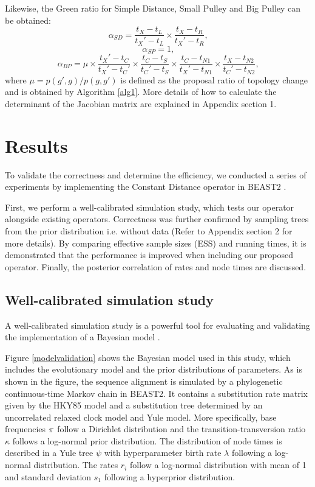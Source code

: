 \documentclass{bmcart}
\begin{document}
Likewise, the Green ratio for Simple Distance, Small Pulley and  Big Pulley can be obtained:
\begin{equation}\label{HR2}
{\alpha_{SD}} = \frac{{{t_X} - {t_L}}}{{{t_X}' - {t_L}}} \times \frac{{{t_X} - {t_R}}}{{{t_X}' - {t_R}}}\text{,}
\end{equation}
\begin{equation}\label{HR3}
{\alpha_{SP}}  = 1\text{,}
\end{equation}
\begin{equation}\label{HR4}
{\alpha_{BP}} = \mu \times \frac{{{t_X}' - {t_C}}}{{{t_X}' - {t_C}'}} \times \frac{{{t_C} - {t_S}}}{{{t_C}' - {t_S}}} \times \frac{{{t_C} - {t_{N1}}}}{{{t_X}' - {t_{N1}}}} \times \frac{{{t_X} - {t_{N2}}}}{{{t_C}' - {t_{N2}}}}\text{,}
\end{equation}
where $\mu = p(g', g) / p(g, g')$ is defined as the proposal ratio of topology change and is obtained by Algorithm \ref{alg1}. More details of how to calculate the determinant of the Jacobian matrix are explained in Appendix section 1.

\section*{Results}
To validate the correctness and determine the efficiency, we conducted a series of experiments by implementing the Constant Distance operator in BEAST2 \cite{bouckaert2014beast}.

First, we perform a well-calibrated simulation study, which tests our operator alongside existing operators. Correctness was further confirmed by sampling trees from the prior distribution i.e. without data (Refer to Appendix section 2 for more details). By comparing effective sample sizes (ESS) \cite{Tracer} and running times, it is demonstrated that the performance is improved when including our proposed operator. Finally, the posterior correlation of rates and node times are discussed.

\subsection*{Well-calibrated simulation study}
A well-calibrated simulation study is a powerful tool for evaluating and validating the implementation of a Bayesian model \cite{dawid1982well}.

Figure \ref{modelvalidation} shows the Bayesian model used in this study, which includes the evolutionary model and the prior distributions of parameters. As is shown in the figure, the sequence alignment is simulated by a phylogenetic continuous-time Markov chain in BEAST2. It contains a substitution rate matrix given by the HKY85 \cite{hasegawa1985dating} model and a substitution tree determined by an uncorrelated relaxed clock model and Yule model. More specifically, base frequencies $\bf{\pi}$ follow a Dirichlet distribution and the transition-transversion ratio $\kappa$ follows a log-normal prior distribution. The distribution of node times is described in a Yule tree $\psi$ with hyperparameter birth rate $\lambda $ following a log-normal distribution. The rates $r_i$ follow a log-normal distribution with mean of 1 and standard deviation $s_1$ following a hyperprior distribution.
\end{document}
